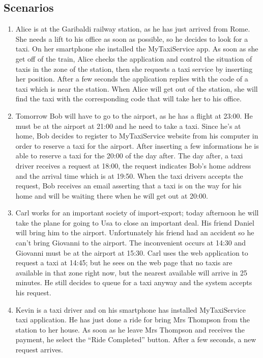 \documentclass[11pt, a4paper,titlepage]{article}
\newcommand{\productname}{MyTaxiService }
\begin{document}
\subsection{Scenarios}
\begin{enumerate}
	\item Alice is at the Garibaldi railway station, as he has just arrived from Rome.
	She needs a lift to his office as soon as possible, so he decides to look for a taxi.
	On her smartphone she installed the \productname app.
	As soon as she get off of the train, Alice checks the application and control the situation of taxis in the zone of the station, then she requests a taxi service by inserting her position.
	After a few seconds the application replies with the code of a taxi which is near the station.
	When Alice will get out of the station, she will find the taxi with the corresponding code that will take her to his office.
	\item Tomorrow Bob will have to go to the airport, as he has a flight at 23:00.
	He must be at the airport at 21:00 and he need to take a taxi.
	Since he’s at home, Bob decides to register to \productname website from his computer in order to reserve a taxi for the airport. After inserting a few informations he is able to reserve a taxi for the 20:00 of the day after.
	The day after, a taxi driver receives a request at 18:00, the request indicates Bob’s home address and the arrival time which is at 19:50.
	When the taxi drivers accepts the request, Bob receives an email asserting that a taxi is on the way for his home and will be waiting there when he will get out at 20:00.
	\item Carl works for an important society of import-export; today afternoon he will take the plane for going to Usa to close an important deal. His friend Daniel will bring him to the airport.
	Unfortunately his friend had an accident so he can’t bring Giovanni to the airport.
	The inconvenient occurs at 14:30 and Giovanni must be at the airport at 15:30.
	Carl uses the web application to request a taxi at 14:45; but he sees on the web page that no taxis are available in that zone right now, but the nearest available will arrive in 25 minutes. He still decides to queue for a taxi anyway and the system accepts his request.
	\item Kevin is a taxi driver and on his smartphone has installed \productname taxi application.
	He has just done a ride for bring Mrs Thompson from the station to her house.
	As soon as he leave Mrs Thompson and receives the payment, he select the “Ride Completed” button. After a few seconds, a new request arrives.

\end{enumerate}
\end{document}
